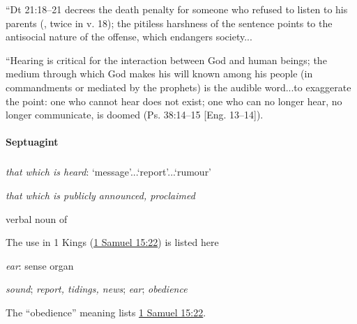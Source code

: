 				``Dt 21:18--21 decrees the death penalty for someone who refused to listen to his parents (, twice in v. 18); the pitiless harshness of the sentence points to the antisocial nature of the offense, which endangers society...
				
				``Hearing is critical for the interaction between God and human beings; the medium through which God makes his will known among his people (in commandments or mediated by the prophets) is the audible word...to exaggerate the point: one who cannot hear does not exist; one who can no longer hear, no longer communicate, is doomed (Ps. 38:14--15 [Eng. 13--14]).
			
		\paragraph{Septuagint}
			\label{OBEDIENCE-LXX}
			
			\subparagraph{\texorpdfstring{}{}}
				\label{AKOE}
			
				\begin{compactdesc}
					\item[GELS 21a, PDF 62] \textbf{}
						\begin{compactitem}
							\item[1.a] \textit{that which is heard}: `message'...`report'...`rumour'
							\item[1.b] \textit{that which is publicly announced, proclaimed}
							\item[1.c] verbal noun of 
								\begin{compactitem}
									\item The use in 1 Kings (\hyperref[1SAMUEL-15-22]{1 Samuel 15:22}) is listed here
								\end{compactitem}
							\item[2] \textit{ear}: sense organ
						\end{compactitem}
					\item[GELSLEH 21] \textbf{}
						\begin{compactitem}
							\item \textit{sound}; \textit{report, tidings, news}; \textit{ear}; \textit{obedience}
								\begin{compactitem}
									\item The ``obedience'' meaning lists \hyperref[1SAMUEL-15-22]{1 Samuel 15:22}.
								\end{compactitem}
						\end{compactitem}
				\end{compactdesc}
				
